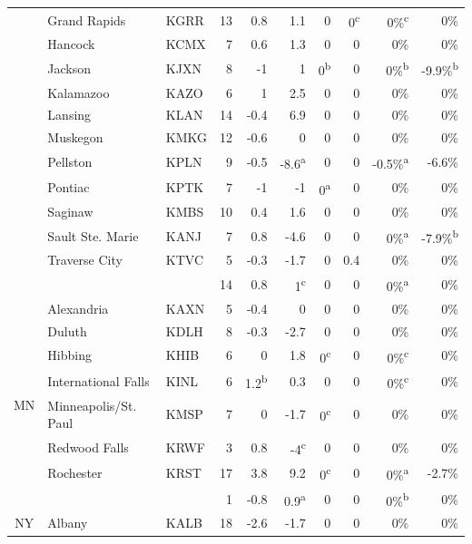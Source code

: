 \documentclass[twocol]{ametsoc}
\begin{document}
\begin{landscape}
\begin{table}[]
\begin{tabular}{@{}cllrrrrrrr@{}}
 & Grand Rapids & KGRR & 13 & 0.8 & 1.1 & 0 & 0\textsuperscript{c} & 0\%\textsuperscript{c} & 0\% \\
 & Hancock & KCMX & 7 & 0.6 & 1.3 & 0 & 0 & 0\% & 0\% \\
 & Jackson & KJXN & 8 & -1 & 1 & 0\textsuperscript{b} & 0 & 0\%\textsuperscript{b} & -9.9\%\textsuperscript{b} \\
 & Kalamazoo & KAZO & 6 & 1 & 2.5 & 0 & 0 & 0\% & 0\% \\
 & Lansing & KLAN & 14 & -0.4 & 6.9 & 0 & 0 & 0\% & 0\% \\
 & Muskegon & KMKG & 12 & -0.6 & 0 & 0 & 0 & 0\% & 0\% \\
 & Pellston & KPLN & 9 & -0.5 & -8.6\textsuperscript{a} & 0 & 0 & -0.5\%\textsuperscript{a} & -6.6\% \\
 & Pontiac & KPTK & 7 & -1 & -1 & 0\textsuperscript{a} & 0 & 0\% & 0\% \\
 & Saginaw & KMBS & 10 & 0.4 & 1.6 & 0 & 0 & 0\% & 0\% \\
 & Sault Ste. Marie & KANJ & 7 & 0.8 & -4.6 & 0 & 0 & 0\%\textsuperscript{a} & -7.9\%\textsuperscript{b} \\
 & Traverse City & KTVC & 5 & -0.3 & -1.7 & 0 & 0.4 & 0\% & 0\% \\ \cmidrule(l){2-10} 
 &  &  & 14 & 0.8 & 1\textsuperscript{c} & 0 & 0 & 0\%\textsuperscript{a} & 0\% \\ \midrule
\multirow{8}{*}{MN} & Alexandria & KAXN & 5 & -0.4 & 0 & 0 & 0 & 0\% & 0\% \\
 & Duluth & KDLH & 8 & -0.3 & -2.7 & 0 & 0 & 0\% & 0\% \\
 & Hibbing & KHIB & 6 & 0 & 1.8 & 0\textsuperscript{c} & 0 & 0\%\textsuperscript{c} & 0\% \\
 & International Falls & KINL & 6 & 1.2\textsuperscript{b} & 0.3 & 0 & 0 & 0\%\textsuperscript{c} & 0\% \\
 & Minneapolis/St. Paul & KMSP & 7 & 0 & -1.7 & 0\textsuperscript{c} & 0 & 0\% & 0\% \\
 & Redwood Falls & KRWF & 3 & 0.8 & -4\textsuperscript{c} & 0 & 0 & 0\% & 0\% \\
 & Rochester & KRST & 17 & 3.8 & 9.2 & 0\textsuperscript{c} & 0 & 0\%\textsuperscript{a} & -2.7\% \\ \cmidrule(l){2-10} 
 &  &  & 1 & -0.8 & 0.9\textsuperscript{a} & 0 & 0 & 0\%\textsuperscript{b} & 0\% \\ \midrule
\multirow{16}{*}{NY} & Albany & KALB & 18 & -2.6 & -1.7 & 0 & 0 & 0\% & 0\% \\

\end{tabular}
\end{table}
\end{landscape}
\end{document}

